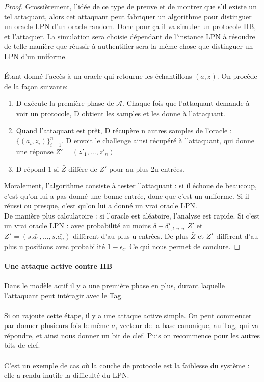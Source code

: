 \documentclass{article}		%
\theoremstyle{definition}
\theoremstyle{plain}
\theoremstyle{plain}
\theoremstyle{plain}
\theoremstyle{plain}
\theoremstyle{plain}
\begin{document}
\begin{proof}
Grossièrement, l'idée de ce type de preuve et de montrer que s'il existe un tel
attaquant, alors cet attaquant peut fabriquer un algorithme pour
distinguer un oracle LPN d'un oracle random. Donc pour ça il va simuler un protocole HB, et l'attaquer. La
simulation sera choisie dépendant de l'instance LPN à résoudre  de telle manière que réussir à authentifier sera
la même chose que distinguer un LPN d'un uniforme.
\\\\ Étant donné l'accès à un oracle qui retourne les échantillons
$(a,z)$. On procède de la façon suivante: 
\begin{enumerate}
\item D exécute la première phase de $\mathcal{A}$. Chaque fois que
l'attaquant demande à voir un protocole, D obtient les samples et les
donne à l'attaquant.
\item Quand l'attaquant est prêt, D récupère n autres samples de l'oracle
: $\{(\bar{a_i},\bar{z_i})\}_{i=1}^{n}$. D envoit le challenge ainsi récupéré à
l'attaquant, qui donne une réponse $Z'=(z'_1,\dots,z'_n)$
\item D répond $1$ si $\bar{Z}$ diffère de $Z'$ pour au plus 2u entrées.
\end{enumerate}
Moralement, l'algorithme consiste à tester l'attaquant : si il échoue de
beaucoup, c'est qu'on lui a pas donné une bonne entrée, donc que c'est un
uniforme. Si il réussi ou presque, c'est qu'on lui a donné un vrai oracle LPN.
\\
De manière plus calculatoire : si l'oracle est aléatoire, l'analyse est
rapide. Si c'est un vrai oracle LPN : avec probabilité au moins
$\delta+\delta^{\star}_{\epsilon,l,u,n}$ $Z'$ et
$Z^{\star}=(s.\bar{a_1},\dots,s.\bar{a_n})$ diffèrent
d'au plus u entrées. De plus $\bar{Z}$ et $Z^{\star}$ diffèrent d'au plus
u positions avec probabilité $1-\epsilon_c$. Ce qui nous permet de
conclure.
\end{proof}
\paragraph{Une attaque active contre HB}
Dans le modèle actif il y a une première phase en plus, durant laquelle
l'attaquant peut intéragir avec le Tag.
\\\\
 Si on rajoute cette étape, 
il y a une attaque active simple. On peut commencer par donner plusieurs
fois le même $a$, vecteur de la base canonique, au Tag, qui va répondre,
et ainsi nous donner un bit de clef. Puis on recommence pour les autres
bits de clef.
\\\\ 
C'est un exemple de cas où la couche de protocole est la faiblesse du
système : elle a rendu inutile la difficulté du LPN. 
\end{document}
